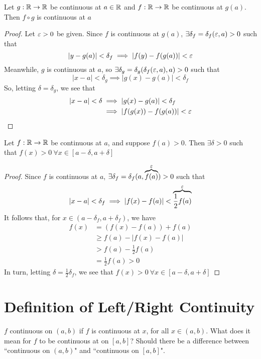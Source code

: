 \begin{lemma}
    Let $g: \mathbb R \rightarrow \mathbb R$ be continuous at $a \in \mathbb R$ and $f: \mathbb R \rightarrow \mathbb R$ be continuous at $g(a)$. 
    Then $f \circ g$ is continuous at $a$
\end{lemma}

\begin{proof}
    Let $\varepsilon > 0$ be given. Since $f$ is continuous at $g(a)$, $\exists \delta_f = \delta_f(\varepsilon, a) > 0$ such that 
    $$|y - g(a)| < \delta_f \implies |f(y) - f(g(a))| < \varepsilon$$
    Meanwhile, $g$ is continuous at $a$, so $\exists \delta_g = \delta_g(\delta_f(\varepsilon, a), a) > 0$ such that
    $$|x - a| < \delta_g \implies |g(x) - g(a)| < \delta_f$$
    So, letting $\delta = \delta_g$, we see that
    \begin{align*}
        |x-a| < \delta &\implies |g(x) - g(a)| < \delta_f \\
        &\implies |f(g(x)) - f(g(a))| < \varepsilon
    \end{align*} 
\end{proof}

\begin{lemma}
    Let $f: \mathbb R \rightarrow \mathbb R$ be continuous at $a$, and suppose $f(a) > 0$. 
    Then $\exists \delta > 0$ such that $f(x) > 0\ \forall x \in \left[a - \delta, a + \delta\right]$
\end{lemma}

\begin{proof}
    Since $f$ is continuous at $a$, $\exists \delta_f = \delta_f(a, \overbrace{f(a)}^\varepsilon) > 0$ such that
    $$|x-a| < \delta_f \implies |f(x) - f(a)| < \overbrace{\frac{1}{2}f(a)}^\varepsilon$$
    It follows that, for $x \in (a - \delta_f, a + \delta_f)$, we have
    \begin{align*}
        f(x) &= (f(x) - f(a)) + f(a) \\
        &\geq f(a) - |f(x) - f(a)| \\
        &> f(a) - \frac{1}{2}f(a) \\
        &= \frac{1}{2}f(a) > 0
    \end{align*}
    In turn, letting $\delta = \frac{1}{2}\delta_f$, we see that $f(x) > 0\ \forall x \in \left[a - \delta, a + \delta\right]$
\end{proof}


\section{Definition of Left/Right Continuity}

$f$ continuous on $(a, b)$ if $f$ is continuous at $x$, for all $x \in (a, b)$.
What does it mean for $f$ to be continuous at on $\left[a, b\right]$?
Should there be a difference between ``continuous on $(a, b)$" and ``continuous on $\left[a, b\right]$".

